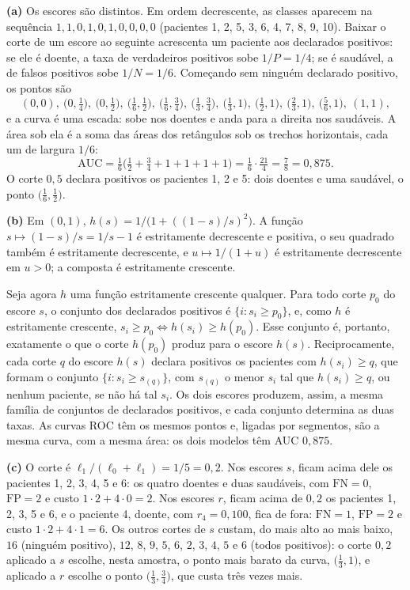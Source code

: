 \begin{solucao}
\textbf{(a)} Os escores são distintos. Em ordem decrescente, as classes aparecem na
sequência $1,1,0,1,0,1,0,0,0,0$ (pacientes 1, 2, 5, 3, 6, 4, 7, 8, 9, 10). Baixar o corte
de um escore ao seguinte acrescenta um paciente aos declarados positivos: se ele é doente,
a taxa de verdadeiros positivos sobe $1/P=1/4$; se é saudável, a de falsos positivos sobe
$1/N=1/6$. Começando sem ninguém declarado positivo, os pontos são
\[
  (0,0),\ \big(0,\tfrac14\big),\ \big(0,\tfrac12\big),\ \big(\tfrac16,\tfrac12\big),\
  \big(\tfrac16,\tfrac34\big),\ \big(\tfrac13,\tfrac34\big),\ \big(\tfrac13,1\big),\
  \big(\tfrac12,1\big),\ \big(\tfrac23,1\big),\ \big(\tfrac56,1\big),\ (1,1),
\]
e a curva é uma escada: sobe nos doentes e anda para a direita nos saudáveis. A área sob
ela é a soma das áreas dos retângulos sob os trechos horizontais, cada um de largura $1/6$:
\[
  \mathrm{AUC}=\tfrac16\Big(\tfrac12+\tfrac34+1+1+1+1\Big)=\tfrac16\cdot\tfrac{21}{4}=\tfrac78=0{,}875 .
\]
O corte $0{,}5$ declara positivos os pacientes 1, 2 e 5: dois doentes e uma saudável, o ponto
$\big(\tfrac16,\tfrac12\big)$.

\smallskip
\textbf{(b)} Em $(0,1)$, $h(s)=1/\big(1+((1-s)/s)^2\big)$. A função $s\mapsto(1-s)/s=1/s-1$ é
estritamente decrescente e positiva, o seu quadrado também é estritamente decrescente, e
$u\mapsto1/(1+u)$ é estritamente decrescente em $u>0$; a composta é estritamente crescente.

Seja agora $h$ uma função estritamente crescente qualquer. Para todo corte $p_0$ do escore
$s$, o conjunto dos declarados positivos é $\{i: s_i\ge p_0\}$, e, como $h$ é estritamente
crescente, $s_i\ge p_0\iff h(s_i)\ge h(p_0)$. Esse conjunto é, portanto, exatamente o que o
corte $h(p_0)$ produz para o escore $h(s)$. Reciprocamente, cada corte $q$ do escore $h(s)$
declara positivos os pacientes com $h(s_i)\ge q$, que formam o conjunto
$\{i: s_i\ge s_{(q)}\}$, com $s_{(q)}$ o menor $s_i$ tal que $h(s_i)\ge q$, ou nenhum paciente,
se não há tal $s_i$. Os dois escores produzem, assim, a mesma família de conjuntos de
declarados positivos, e cada conjunto determina as duas taxas. As curvas ROC têm os mesmos
pontos e, ligadas por segmentos, são a mesma curva, com a mesma área: os dois modelos têm
AUC $0{,}875$.

\smallskip
\textbf{(c)} O corte é $\ell_1/(\ell_0+\ell_1)=1/5=0{,}2$. Nos escores $s$, ficam acima dele
os pacientes 1, 2, 3, 4, 5 e 6: os quatro doentes e duas saudáveis, com $\mathrm{FN}=0$,
$\mathrm{FP}=2$ e custo $1\cdot2+4\cdot0=2$. Nos escores $r$, ficam acima de $0{,}2$ os
pacientes 1, 2, 3, 5 e 6, e o paciente 4, doente, com $r_4=0{,}100$, fica de fora: $\mathrm{FN}=1$,
$\mathrm{FP}=2$ e custo $1\cdot2+4\cdot1=6$. Os outros cortes de $s$ custam, do mais alto ao
mais baixo, $16$ (ninguém positivo), $12$, $8$, $9$, $5$, $6$, $2$, $3$, $4$, $5$ e $6$
(todos positivos): o corte $0{,}2$ aplicado a $s$ escolhe, nesta amostra, o ponto mais
barato da curva, $\big(\tfrac13,1\big)$, e aplicado a $r$ escolhe o ponto
$\big(\tfrac13,\tfrac34\big)$, que custa três vezes mais.


\end{solucao}

